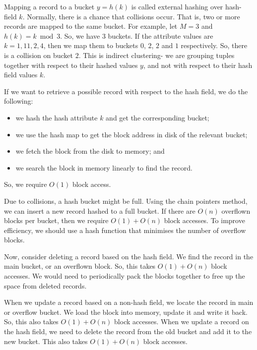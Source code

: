 \documentclass[a4paper, openany]{memoir}
\begin{document}
Mapping a record to a bucket $y = h(k)$ is called external hashing over hash-field $k$. Normally, there is a chance that collisions occur. That is, two or more records are mapped to the same bucket. For example, let $M = 3$ and $h(k) = k \bmod{3}$. So, we have 3 buckets. If the attribute values are $k = 1, 11, 2, 4$, then we map them to buckets $0$, $2$, $2$ and $1$ respectively. So, there is a collision on bucket $2$. This is indirect clustering- we are grouping tuples together with respect to their hashed values $y$, and not with respect to their hash field values $k$.

If we want to retrieve a possible record with respect to the hash field, we do the following:
\begin{itemize}
    \item we hash the hash attribute $k$ and get the corresponding bucket;
    \item we use the hash map to get the block address in disk of the relevant bucket;
    \item we fetch the block from the disk to memory; and
    \item we search the block in memory linearly to find the record.
\end{itemize}
So, we require $O(1)$ block access.

Due to collisions, a hash bucket might be full. Using the chain pointers method, we can insert a new record hashed to a full bucket. If there are $O(n)$ overflown blocks per bucket, then we require $O(1) + O(n)$ block accesses. To improve efficiency, we should use a hash function that minimises the number of overflow blocks.

Now, consider deleting a record based on the hash field. We find the record in the main bucket, or an overflown block. So, this takes $O(1) + O(n)$ block accesses. We would need to periodically pack the blocks together to free up the space from deleted records.

When we update a record based on a non-hash field, we locate the record in main or overflow bucket. We load the block into memory, update it and write it back. So, this also takes $O(1) + O(n)$ block accesses. When we update a record on the hash field, we need to delete the record from the old bucket and add it to the new bucket. This also takes $O(1) + O(n)$ block accesses.
\end{document}
